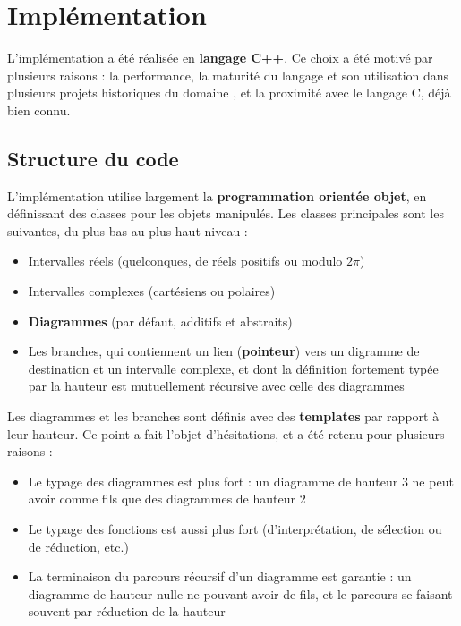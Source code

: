 \chapter{Implémentation}
\label{ch:Implementation}

L’implémentation a été réalisée en \textbf{langage C++}. Ce choix a été motivé par plusieurs raisons : la performance, la maturité du langage et son utilisation dans plusieurs projets historiques du domaine \cite{Bichsel_2023}, et la proximité avec le langage C, déjà bien connu.

\section{Structure du code}

L'implémentation utilise largement la \textbf{programmation orientée objet}, en définissant des classes pour les objets manipulés. Les classes principales sont les suivantes, du plus bas au plus haut niveau :
\begin{itemize}
  \item Intervalles réels (quelconques, de réels positifs ou modulo $2\pi$)
  \item Intervalles complexes (cartésiens ou polaires)
  \item \textbf{Diagrammes} (par défaut, additifs et abstraits)
  \item Les branches, qui contiennent un lien (\textbf{pointeur}) vers un digramme de destination et un intervalle complexe, et dont la définition fortement typée par la hauteur est mutuellement récursive avec celle des diagrammes
\end{itemize}

Les diagrammes et les branches sont définis avec des \textbf{templates} par rapport à leur hauteur. Ce point a fait l'objet d'hésitations, et a été retenu pour plusieurs raisons :
\begin{itemize}
  \item Le typage des diagrammes est plus fort : un diagramme de hauteur 3 ne peut avoir comme fils que des diagrammes de hauteur 2
  \item Le typage des fonctions est aussi plus fort (d'interprétation, de sélection ou de réduction, etc.)
  \item La terminaison du parcours récursif d'un diagramme est garantie : un diagramme de hauteur nulle ne pouvant avoir de fils, et le parcours se faisant souvent par réduction de la hauteur
\end{itemize}

